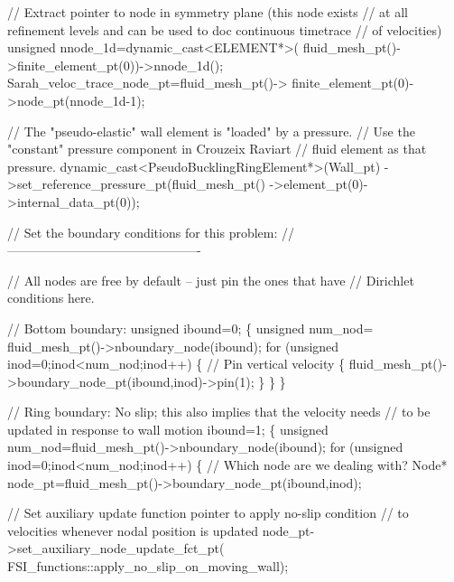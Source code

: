 \begin{DoxyCodeInclude}
 \textcolor{comment}{//  Extract pointer to node in symmetry plane (this node exists}
 \textcolor{comment}{// at all refinement levels and can be used to doc continuous timetrace}
 \textcolor{comment}{// of velocities)}
 \textcolor{keywordtype}{unsigned} nnode\_1d=\textcolor{keyword}{dynamic\_cast<}ELEMENT*\textcolor{keyword}{>}(
  fluid\_mesh\_pt()->finite\_element\_pt(0))->nnode\_1d();
 Sarah\_veloc\_trace\_node\_pt=fluid\_mesh\_pt()->
  finite\_element\_pt(0)->node\_pt(nnode\_1d-1);

 \textcolor{comment}{// The "pseudo-elastic" wall element is "loaded" by a pressure.}
 \textcolor{comment}{// Use the "constant" pressure component in Crouzeix Raviart}
 \textcolor{comment}{// fluid element as that pressure. }
 \textcolor{keyword}{dynamic\_cast<}PseudoBucklingRingElement*\textcolor{keyword}{>}(Wall\_pt)
  ->set\_reference\_pressure\_pt(fluid\_mesh\_pt()
                              ->element\_pt(0)->internal\_data\_pt(0));


 \textcolor{comment}{// Set the boundary conditions for this problem:}
 \textcolor{comment}{//----------------------------------------------}

 \textcolor{comment}{// All nodes are free by default -- just pin the ones that have }
 \textcolor{comment}{// Dirichlet conditions here. }
 
 \textcolor{comment}{// Bottom boundary: }
 \textcolor{keywordtype}{unsigned} ibound=0;
  \{
   \textcolor{keywordtype}{unsigned} num\_nod= fluid\_mesh\_pt()->nboundary\_node(ibound);
   \textcolor{keywordflow}{for} (\textcolor{keywordtype}{unsigned} inod=0;inod<num\_nod;inod++)
    \{
     \textcolor{comment}{// Pin vertical velocity}
     \{
       fluid\_mesh\_pt()->boundary\_node\_pt(ibound,inod)->pin(1); 
     \}
    \}
  \}
  
 \textcolor{comment}{// Ring boundary: No slip; this also implies that the velocity needs}
 \textcolor{comment}{// to be updated in response to wall motion}
 ibound=1;
  \{
   \textcolor{keywordtype}{unsigned} num\_nod=fluid\_mesh\_pt()->nboundary\_node(ibound);
   \textcolor{keywordflow}{for} (\textcolor{keywordtype}{unsigned} inod=0;inod<num\_nod;inod++)
    \{
     \textcolor{comment}{// Which node are we dealing with?}
     Node* node\_pt=fluid\_mesh\_pt()->boundary\_node\_pt(ibound,inod);
     
     \textcolor{comment}{// Set auxiliary update function pointer to apply no-slip condition}
     \textcolor{comment}{// to velocities whenever nodal position is updated}
     node\_pt->set\_auxiliary\_node\_update\_fct\_pt(
      FSI\_functions::apply\_no\_slip\_on\_moving\_wall);


\end{DoxyCodeInclude}
